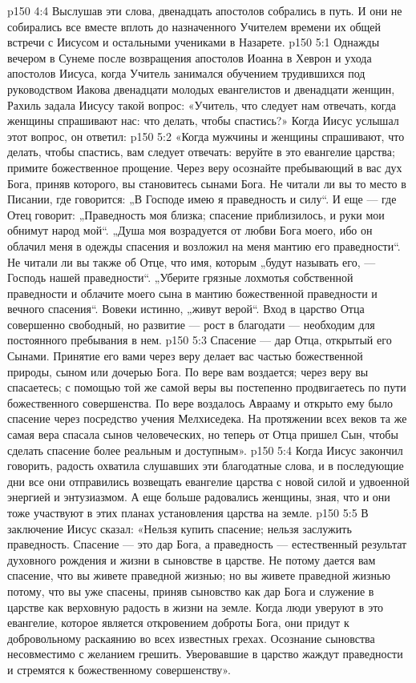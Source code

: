 \vs p150 4:4 Выслушав эти слова, двенадцать апостолов собрались в путь. И они не собирались все вместе вплоть до назначенного Учителем времени их общей встречи с Иисусом и остальными учениками в Назарете.
\vs p150 5:1 Однажды вечером в Сунеме после возвращения апостолов Иоанна в Хеврон и ухода апостолов Иисуса, когда Учитель занимался обучением трудившихся под руководством Иакова двенадцати молодых евангелистов и двенадцати женщин, Рахиль задала Иисусу такой вопрос: «Учитель, что следует нам отвечать, когда женщины спрашивают нас: что делать, чтобы спастись?» Когда Иисус услышал этот вопрос, он ответил:
\vs p150 5:2 \pc «Когда мужчины и женщины спрашивают, что делать, чтобы спастись, вам следует отвечать: веруйте в это евангелие царства; примите божественное прощение. Через веру осознайте пребывающий в вас дух Бога, приняв которого, вы становитесь сынами Бога. Не читали ли вы то место в Писании, где говорится: „В Господе имею я праведность и силу“. И еще --- где Отец говорит: „Праведность моя близка; спасение приблизилось, и руки мои обнимут народ мой“. „Душа моя возрадуется от любви Бога моего, ибо он облачил меня в одежды спасения и возложил на меня мантию его праведности“. Не читали ли вы также об Отце, что имя, которым „будут называть его, --- Господь нашей праведности“. „Уберите грязные лохмотья собственной праведности и облачите моего сына в мантию божественной праведности и вечного спасения“. Вовеки истинно, „живут верой“. Вход в царство Отца совершенно свободный, но развитие --- рост в благодати --- необходим для постоянного пребывания в нем.
\vs p150 5:3 Спасение --- дар Отца, открытый его Сынами. Принятие его вами через веру делает вас частью божественной природы, сыном или дочерью Бога. По вере вам воздается; через веру вы спасаетесь; с помощью той же самой веры вы постепенно продвигаетесь по пути божественного совершенства. По вере воздалось Аврааму и открыто ему было спасение через посредство учения Мелхиседека. На протяжении всех веков та же самая вера спасала сынов человеческих, но теперь от Отца пришел Сын, чтобы сделать спасение более реальным и доступным».
\vs p150 5:4 \pc Когда Иисус закончил говорить, радость охватила слушавших эти благодатные слова, и в последующие дни все они отправились возвещать евангелие царства с новой силой и удвоенной энергией и энтузиазмом. А еще больше радовались женщины, зная, что и они тоже участвуют в этих планах установления царства на земле.
\vs p150 5:5 В заключение Иисус сказал: «Нельзя купить спасение; нельзя заслужить праведность. Спасение --- это дар Бога, а праведность --- естественный результат духовного рождения и жизни в сыновстве в царстве. Не потому дается вам спасение, что вы живете праведной жизнью; но вы живете праведной жизнью потому, что вы уже спасены, приняв сыновство как дар Бога и служение в царстве как верховную радость в жизни на земле. Когда люди уверуют в это евангелие, которое является откровением доброты Бога, они придут к добровольному раскаянию во всех известных грехах. Осознание сыновства несовместимо с желанием грешить. Уверовавшие в царство жаждут праведности и стремятся к божественному совершенству».
